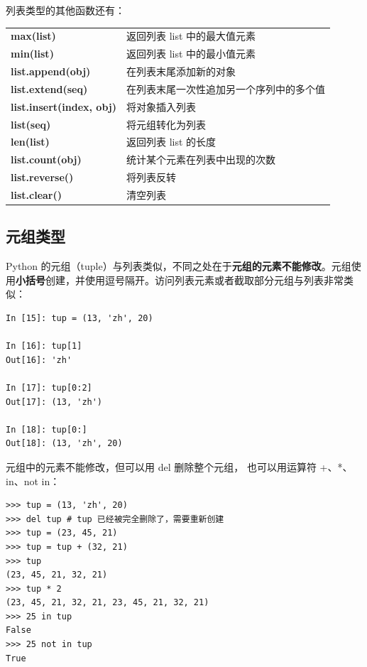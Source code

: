 列表类型的其他函数还有：
\begin{center}
\begin{tcolorbox} [title = 列表类型的一些处理函数]
  \bf
  \begin{tcboutputlisting}
  \begin{tabular}{>{\bfseries}ll}
    max(list) &返回列表 list 中的最大值元素\\
    min(list)&返回列表 list 中的最小值元素\\
    list.append(obj) &在列表末尾添加新的对象\\
    list.extend(seq) & 在列表末尾一次性追加另一个序列中的多个值\\
    list.insert(index, obj) & 将对象插入列表\\
    list(seq) & 将元组转化为列表\\
    len(list) &返回列表 list 的长度\\
    list.count(obj) & 统计某个元素在列表中出现的次数\\
  list.reverse() &将列表反转\\
  list.clear() & 清空列表
  \end{tabular}
\end{tcboutputlisting}
\end{tcolorbox}
\end{center}

\subsection{元组类型}

Python 的元组（tuple）与列表类似，不同之处在于\textbf{元组的元素不能修改}。元组使用\textbf{小括号}创建，并使用逗号隔开。访问列表元素或者截取部分元组与列表非常类似：

\begin{lstlisting}[Language=Python]
In [15]: tup = (13, 'zh', 20)

In [16]: tup[1]
Out[16]: 'zh'

In [17]: tup[0:2]
Out[17]: (13, 'zh')

In [18]: tup[0:]
Out[18]: (13, 'zh', 20)
\end{lstlisting}

元组中的元素不能修改，但可以用 del 删除整个元组， 也可以用运算符 +、*、in、not in：

\begin{lstlisting}[Language=Python]
>>> tup = (13, 'zh', 20)
>>> del tup # tup 已经被完全删除了，需要重新创建
>>> tup = (23, 45, 21)
>>> tup = tup + (32, 21)
>>> tup
(23, 45, 21, 32, 21)
>>> tup * 2
(23, 45, 21, 32, 21, 23, 45, 21, 32, 21)
>>> 25 in tup
False
>>> 25 not in tup
True
\end{lstlisting}

